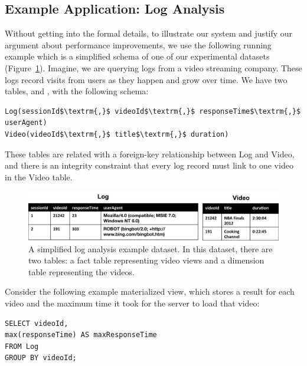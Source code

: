 \subsection{Example Application: Log Analysis}
Without getting into the formal details, to illustrate our system and justify our argument about performance improvements, we use the following running example which is a 
simplified schema of one of our experimental datasets (Figure~\ref{example-1}).
Imagine, we are querying logs from a video streaming company. 
These logs record visits from users as they happen and grow over time.
We have two tables,  and , with the following schema:

\begin{lstlisting}[mathescape]
Log(sessionId$\textrm{,}$ videoId$\textrm{,}$ responseTime$\textrm{,}$ userAgent)
Video(videoId$\textrm{,}$ title$\textrm{,}$ duration)
\end{lstlisting}
These tables are related with a foreign-key relationship between
Log and Video, and there is an integrity constraint that every log
record must link to one video in the Video table.

\begin{figure}[ht!] 
\centering
\vspace{-0.75em}
 \includegraphics[width=\columnwidth]{figs/sample-clean-example.png}\vspace{-0.25em}
 \caption{A simplified log analysis example dataset. In this dataset, there are two tables: a fact table representing video views and a dimension table representing the videos.\label{example-1}}
\end{figure}

Consider the following example materialized view, which stores a result for each video and the maximum time it took for the server to load that video:

\vspace{0.5em}

\begin{lstlisting} 
SELECT videoId, 
max(responseTime) AS maxResponseTime 
FROM Log 
GROUP BY videoId;
\end{lstlisting}

